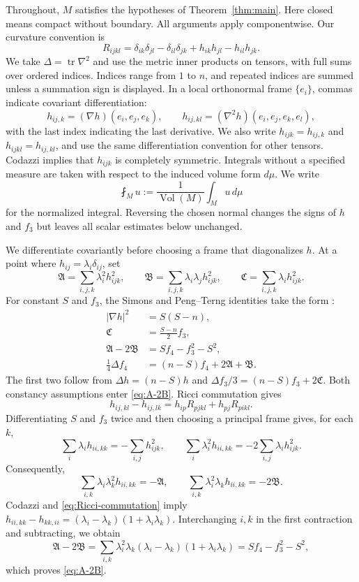 \documentclass[11pt,reqno]{amsart}
\numberwithin{equation}{section}
\newcommand{\tr}{\operatorname{tr}}
\newcommand{\Vol}{\operatorname{Vol}}
\newcommand{\norm}[1]{\lvert #1\rvert}
\begin{document}
Throughout, $M$ satisfies the hypotheses of Theorem~\ref{thm:main}. Here closed means compact without boundary. All arguments apply componentwise. Our curvature convention is
\[
R_{ijkl}=\delta_{ik}\delta_{jl}-\delta_{il}\delta_{jk}
+h_{ik}h_{jl}-h_{il}h_{jk}.
\]
We take $\Delta=\tr\nabla^2$ and use the metric inner products on tensors, with full sums over ordered indices. Indices range from $1$ to $n$, and repeated indices are summed unless a summation sign is displayed. In a local orthonormal frame $\{e_i\}$, commas indicate covariant differentiation:
\[
h_{ij,k}=(\nabla h)(e_i,e_j,e_k),
\qquad
h_{ij,kl}=(\nabla^2h)(e_i,e_j,e_k,e_l),
\]
with the last index indicating the last derivative. We also write $h_{ijk}=h_{ij,k}$ and $h_{ijkl}=h_{ij,kl}$, and use the same differentiation convention for other tensors. Codazzi implies that $h_{ijk}$ is completely symmetric. Integrals without a specified measure are taken with respect to the induced volume form $d\mu$. We write
\[
\fint_M u:=\frac1{\Vol(M)}\int_Mu\,d\mu
\]
for the normalized integral. Reversing the chosen normal changes the signs of $h$ and $f_3$ but leaves all scalar estimates below unchanged.

We differentiate covariantly before choosing a frame that diagonalizes $h$. At a point where $h_{ij}=\lambda_i\delta_{ij}$, set
\[
\mathfrak A=\sum_{i,j,k}\lambda_i^2h_{ijk}^2,
\qquad
\mathfrak B=\sum_{i,j,k}\lambda_i\lambda_jh_{ijk}^2,
\qquad
\mathfrak C=\sum_{i,j,k}\lambda_i h_{ijk}^2.
\]
For constant $S$ and $f_3$, the Simons and Peng--Terng identities take the form \cite{Simons,PTseminar,PTannalen,YangCheng}:
\begin{align}
\norm{\nabla h}^2&=S(S-n),\label{eq:grad-h}\\
\mathfrak C&=\frac{S-n}{2}f_3,\label{eq:C-id}\\
\mathfrak A-2\mathfrak B&=Sf_4-f_3^2-S^2,\label{eq:A-2B}\\
\frac14\Delta f_4&=(n-S)f_4+2\mathfrak A+\mathfrak B.
\label{eq:lap-f4}
\end{align}
The first two follow from $\Delta h=(n-S)h$ and
$\Delta f_3/3=(n-S)f_3+2\mathfrak C$. Both constancy assumptions enter
\eqref{eq:A-2B}. Ricci commutation gives
\begin{equation}\label{eq:Ricci-commutation}
h_{ij,kl}-h_{ij,lk}
=h_{ip}R_{pjkl}+h_{pj}R_{pikl}.
\end{equation}
Differentiating $S$ and $f_3$ twice and then choosing a principal frame gives, for each $k$,
\[
\sum_i\lambda_i h_{ii,kk}=-\sum_{i,j}h_{ijk}^2,
\qquad
\sum_i\lambda_i^2h_{ii,kk}=-2\sum_{i,j}\lambda_i h_{ijk}^2.
\]
Consequently,
\[
\sum_{i,k}\lambda_i\lambda_k^2h_{ii,kk}=-\mathfrak A,
\qquad
\sum_{i,k}\lambda_i^2\lambda_kh_{ii,kk}=-2\mathfrak B.
\]
Codazzi and \eqref{eq:Ricci-commutation} imply
$h_{ii,kk}-h_{kk,ii}=(\lambda_i-\lambda_k)(1+\lambda_i\lambda_k)$.
Interchanging $i,k$ in the first contraction and subtracting, we obtain
\[
\mathfrak A-2\mathfrak B
=\sum_{i,k}\lambda_i^2\lambda_k(\lambda_i-\lambda_k)(1+\lambda_i\lambda_k)
=Sf_4-f_3^2-S^2,
\]
which proves \eqref{eq:A-2B}.
\end{document}
